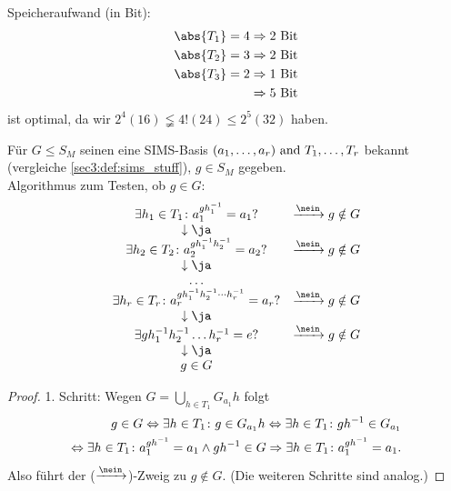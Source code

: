 \begin{*remark}
	Speicheraufwand (in Bit):
	\begin{align*}
		\abs{T_1} = 4 &\implies 2 \text{ Bit}\\
		\abs{T_2} = 3 &\implies 2 \text{ Bit}\\
		\abs{T_3} = 2 &\implies 1 \text{ Bit}\\
				      &\implies 5 \text{ Bit}
	\end{align*}
	ist optimal, da wir $2^4 (16)\lneqq 4! (24) \le 2^5 (32)$ haben.
\end{*remark}
\begin{conclusion}
	Für $G \le S_M$ seinen eine SIMS-Basis $(a_1, \dots, a_r) \text{ and } T_1, \dots, T_r$ bekannt (vergleiche \cref{sec3:def:sims_stuff}), $g \in S_M$ gegeben.\\
	Algorithmus zum Testen, ob $g \in G$:
	\begin{align*}
		\begin{matrix}
			\exists h_1 \in T_1 \colon a_1^{gh_1^{-1}} = a_1? & \xrightarrow{\nein} g \notin G\\
			\downarrow \ja& \\
			\exists h_2 \in T_2 \colon a_2^{gh_1^{-1}h_2^{-1}} = a_2? & \xrightarrow{\nein} g \notin G\\
			\downarrow \ja & \\
			\dots & \\
			\exists h_r \in T_r \colon a_r^{gh_1^{-1}h_2^{-1}\cdots h_r^{-1}} = a_r? & \xrightarrow{\nein} g \notin G\\
			\downarrow \ja & \\
			\exists gh_1^{-1}h_2^{-1}\dots h_r^{-1} = e? & \xrightarrow{\nein} g \notin G\\
			\downarrow \ja & \\
			g \in G
		\end{matrix}
	\end{align*}
\end{conclusion}
\begin{proof}
	1. Schritt: Wegen $G = \bigcup_{h \in T_1} G_{a_1}h$ folgt\\
	\begin{align*}
		g \in G \Leftrightarrow \exists h \in T_1 \colon g \in G_{a_1}h \Leftrightarrow \exists h \in T_1 \colon gh^{-1} \in G_{a_1}\\
		\Leftrightarrow \exists h \in T_1 \colon a_1^{gh^{-1}} = a_1 \wedge gh^{-1} \in G \Rightarrow \exists h \in T_1 \colon a_1^{gh^{-1}} = a_1.
	\end{align*}
	Also führt der ($\xrightarrow{\nein}$)-Zweig zu $g \notin G$. (Die weiteren Schritte sind analog.)
\end{proof}
